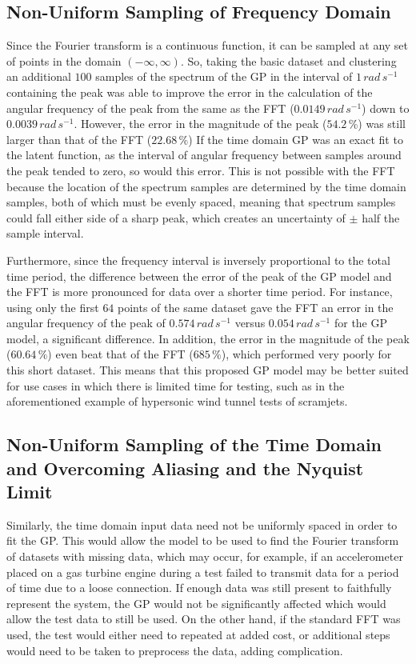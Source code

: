 \documentclass[12pt]{article}
\begin{document}
    \subsection{Non-Uniform Sampling of Frequency Domain}
    Since the Fourier transform is a continuous function, it can be sampled at any set of points in the domain $(-\infty, \infty)$.
     So, taking the basic dataset and clustering an additional $100$ samples of the spectrum of the GP in the interval of $1 \, rad \, s^{-1}$ containing the peak was able to improve the error in the calculation of the angular frequency of the peak from the same as the FFT ($0.0149 \, rad \, s^{-1}$) down to $0.0039 \, rad \, s^{-1} $.
    However, the error in the magnitude of the peak ($54.2 \, \%$) was still larger than that of the FFT ($22.68 \, \%$)
    If the time domain GP was an exact fit to the latent function, as the interval of angular frequency between samples around the peak tended to zero, so would this error.
    This is not possible with the FFT because the location of the spectrum samples are determined by the time domain samples, both of which must be evenly spaced, meaning that spectrum samples could fall either side of a sharp peak, which creates an uncertainty of $\pm$ half the sample interval.

    Furthermore, since the frequency interval is inversely proportional to the total time period, the difference between the error of the peak of the GP model and the FFT is more pronounced for data over a shorter time period.
    For instance, using only the first $64$ points of the same dataset gave the FFT an error in the angular frequency of the peak of $0.574 \, rad \, s^{-1}$ versus $0.054 \, rad \, s^{-1}$ for the GP model, a significant difference.
    In addition, the error in the magnitude of the peak ($60.64 \, \%$) even beat that of the FFT ($685 \, \%$), which performed very poorly for this short dataset.
    This means that this proposed GP model may be better suited for use cases in which there is limited time for testing, such as in the aforementioned example of hypersonic wind tunnel tests of scramjets.

    \subsection{Non-Uniform Sampling of the Time Domain and Overcoming Aliasing and the Nyquist Limit}
    Similarly, the time domain input data need not be uniformly spaced in order to fit the GP\@.
    This would allow the model to be used to find the Fourier transform of datasets with missing data, which may occur, for example, if an accelerometer placed on a gas turbine engine during a test failed to transmit data for a period of time due to a loose connection.
    If enough data was still present to faithfully represent the system, the GP would not be significantly affected which would allow the test data to still be used.
    On the other hand, if the standard FFT was used, the test would either need to repeated at added cost, or additional steps would need to be taken to preprocess the data, adding complication.
\end{document}
